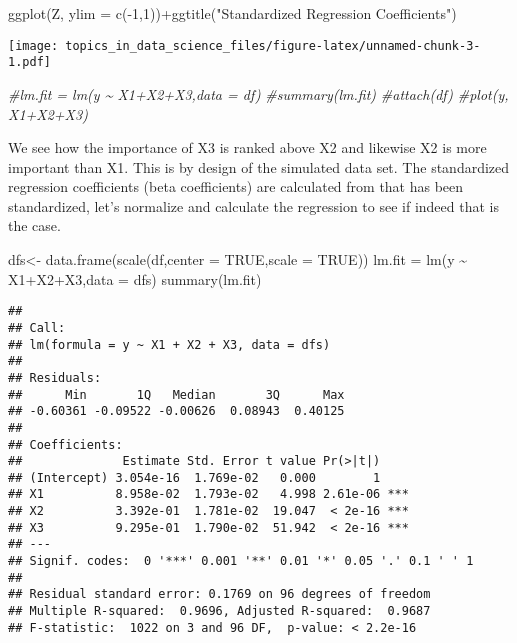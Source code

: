 \documentclass[
  11pt,
]{book}
\newenvironment{Shaded}{\begin{snugshade}}{\end{snugshade}}
\newcommand{\AttributeTok}[1]{\textcolor[rgb]{0.77,0.63,0.00}{#1}}
\newcommand{\CommentTok}[1]{\textcolor[rgb]{0.56,0.35,0.01}{\textit{#1}}}
\newcommand{\ConstantTok}[1]{\textcolor[rgb]{0.00,0.00,0.00}{#1}}
\newcommand{\DecValTok}[1]{\textcolor[rgb]{0.00,0.00,0.81}{#1}}
\newcommand{\FunctionTok}[1]{\textcolor[rgb]{0.00,0.00,0.00}{#1}}
\newcommand{\NormalTok}[1]{#1}
\newcommand{\OtherTok}[1]{\textcolor[rgb]{0.56,0.35,0.01}{#1}}
\newcommand{\SpecialCharTok}[1]{\textcolor[rgb]{0.00,0.00,0.00}{#1}}
\newcommand{\StringTok}[1]{\textcolor[rgb]{0.31,0.60,0.02}{#1}}
\begin{document}
\begin{Shaded}
\begin{Highlighting}[]
\FunctionTok{ggplot}\NormalTok{(Z, }\AttributeTok{ylim =} \FunctionTok{c}\NormalTok{(}\SpecialCharTok{{-}}\DecValTok{1}\NormalTok{,}\DecValTok{1}\NormalTok{))}\SpecialCharTok{+}\FunctionTok{ggtitle}\NormalTok{(}\StringTok{"Standardized Regression Coefficients"}\NormalTok{)}
\end{Highlighting}
\end{Shaded}

\texttt{[image: topics\_in\_data\_science\_files/figure-latex/unnamed-chunk-3-1.pdf]}

\begin{Shaded}
\begin{Highlighting}[]
\CommentTok{\#lm.fit = lm(y \textasciitilde{} X1+X2+X3,data = df)}
\CommentTok{\#summary(lm.fit)}
\CommentTok{\#attach(df)}
\CommentTok{\#plot(y, X1+X2+X3)}
\end{Highlighting}
\end{Shaded}

We see how the importance of X3 is ranked above X2 and likewise X2 is more important than X1. This is by design of the simulated data set. The standardized regression coefficients (beta coefficients) are calculated from that has been standardized, let's normalize and calculate the regression to see if indeed that is the case.

\begin{Shaded}
\begin{Highlighting}[]
\NormalTok{dfs}\OtherTok{\textless{}{-}} \FunctionTok{data.frame}\NormalTok{(}\FunctionTok{scale}\NormalTok{(df,}\AttributeTok{center =} \ConstantTok{TRUE}\NormalTok{,}\AttributeTok{scale =} \ConstantTok{TRUE}\NormalTok{))}
\NormalTok{lm.fit }\OtherTok{=} \FunctionTok{lm}\NormalTok{(y }\SpecialCharTok{\textasciitilde{}}\NormalTok{ X1}\SpecialCharTok{+}\NormalTok{X2}\SpecialCharTok{+}\NormalTok{X3,}\AttributeTok{data =}\NormalTok{ dfs)}
\FunctionTok{summary}\NormalTok{(lm.fit)}
\end{Highlighting}
\end{Shaded}

\begin{verbatim}
## 
## Call:
## lm(formula = y ~ X1 + X2 + X3, data = dfs)
## 
## Residuals:
##      Min       1Q   Median       3Q      Max 
## -0.60361 -0.09522 -0.00626  0.08943  0.40125 
## 
## Coefficients:
##              Estimate Std. Error t value Pr(>|t|)    
## (Intercept) 3.054e-16  1.769e-02   0.000        1    
## X1          8.958e-02  1.793e-02   4.998 2.61e-06 ***
## X2          3.392e-01  1.781e-02  19.047  < 2e-16 ***
## X3          9.295e-01  1.790e-02  51.942  < 2e-16 ***
## ---
## Signif. codes:  0 '***' 0.001 '**' 0.01 '*' 0.05 '.' 0.1 ' ' 1
## 
## Residual standard error: 0.1769 on 96 degrees of freedom
## Multiple R-squared:  0.9696, Adjusted R-squared:  0.9687 
## F-statistic:  1022 on 3 and 96 DF,  p-value: < 2.2e-16
\end{verbatim}
\end{document}
